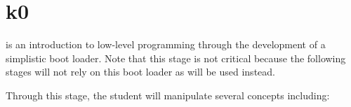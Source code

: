 %
%
%
%
%
%

%
%

\chapter{k0}
\label{chapter:k0}

 is an introduction to low-level programming through the development
of a simplistic boot loader. Note that this stage is not critical because
the following stages will not rely on this boot loader as  will be used instead.

Through this stage, the student will manipulate several concepts including:

